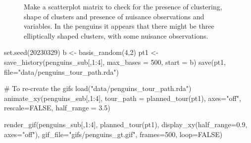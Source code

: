\documentclass[
  letterpaper,
]{krantz}
\newenvironment{Shaded}{\begin{snugshade}}{\end{snugshade}}
\newcommand{\AttributeTok}[1]{\textcolor[rgb]{0.40,0.45,0.13}{#1}}
\newcommand{\CommentTok}[1]{\textcolor[rgb]{0.37,0.37,0.37}{#1}}
\newcommand{\ConstantTok}[1]{\textcolor[rgb]{0.56,0.35,0.01}{#1}}
\newcommand{\DecValTok}[1]{\textcolor[rgb]{0.68,0.00,0.00}{#1}}
\newcommand{\FloatTok}[1]{\textcolor[rgb]{0.68,0.00,0.00}{#1}}
\newcommand{\FunctionTok}[1]{\textcolor[rgb]{0.28,0.35,0.67}{#1}}
\newcommand{\NormalTok}[1]{\textcolor[rgb]{0.00,0.23,0.31}{#1}}
\newcommand{\OtherTok}[1]{\textcolor[rgb]{0.00,0.23,0.31}{#1}}
\newcommand{\SpecialCharTok}[1]{\textcolor[rgb]{0.37,0.37,0.37}{#1}}
\newcommand{\StringTok}[1]{\textcolor[rgb]{0.13,0.47,0.30}{#1}}
\begin{document}
\begin{figure}[H]


\caption{\label{fig-penguins-pairs}Make a scatterplot matrix to check
for the presence of clustering, shape of clusters and presence of
nuisance observations and variables. In the penguins it appears that
there might be three elliptically shaped clusters, with some nuisance
observations.}

\end{figure}%

\begin{Shaded}
\begin{Highlighting}[]
\FunctionTok{set.seed}\NormalTok{(}\DecValTok{20230329}\NormalTok{)}
\NormalTok{b }\OtherTok{\textless{}{-}} \FunctionTok{basis\_random}\NormalTok{(}\DecValTok{4}\NormalTok{,}\DecValTok{2}\NormalTok{)}
\NormalTok{pt1 }\OtherTok{\textless{}{-}} \FunctionTok{save\_history}\NormalTok{(penguins\_sub[,}\DecValTok{1}\SpecialCharTok{:}\DecValTok{4}\NormalTok{], }
                    \AttributeTok{max\_bases =} \DecValTok{500}\NormalTok{, }
                    \AttributeTok{start =}\NormalTok{ b)}
\FunctionTok{save}\NormalTok{(pt1, }\AttributeTok{file=}\StringTok{"data/penguins\_tour\_path.rda"}\NormalTok{)}

\CommentTok{\# To re{-}create the gifs}
\FunctionTok{load}\NormalTok{(}\StringTok{"data/penguins\_tour\_path.rda"}\NormalTok{)}
\FunctionTok{animate\_xy}\NormalTok{(penguins\_sub[,}\DecValTok{1}\SpecialCharTok{:}\DecValTok{4}\NormalTok{], }
           \AttributeTok{tour\_path =} \FunctionTok{planned\_tour}\NormalTok{(pt1), }
           \AttributeTok{axes=}\StringTok{"off"}\NormalTok{, }\AttributeTok{rescale=}\ConstantTok{FALSE}\NormalTok{, }
           \AttributeTok{half\_range =} \FloatTok{3.5}\NormalTok{)}

\FunctionTok{render\_gif}\NormalTok{(penguins\_sub[,}\DecValTok{1}\SpecialCharTok{:}\DecValTok{4}\NormalTok{], }
           \FunctionTok{planned\_tour}\NormalTok{(pt1), }
           \FunctionTok{display\_xy}\NormalTok{(}\AttributeTok{half\_range=}\FloatTok{0.9}\NormalTok{, }\AttributeTok{axes=}\StringTok{"off"}\NormalTok{),}
           \AttributeTok{gif\_file=}\StringTok{"gifs/penguins\_gt.gif"}\NormalTok{,}
           \AttributeTok{frames=}\DecValTok{500}\NormalTok{,}
           \AttributeTok{loop=}\ConstantTok{FALSE}\NormalTok{)}
\end{Highlighting}
\end{Shaded}
\end{document}
